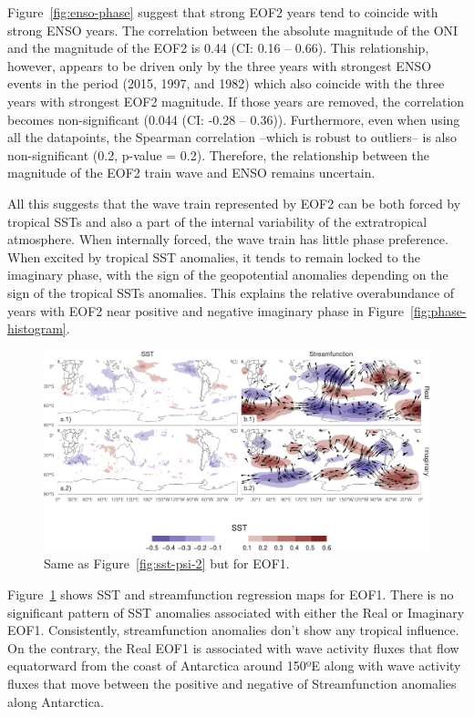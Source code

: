 \documentclass[smallextended]{svjour3}       %
\begin{document}
Figure~\ref{fig:enso-phase} suggest that strong EOF2 years tend to coincide with strong ENSO years. The correlation between the absolute magnitude of the ONI and the magnitude of the EOF2 is 0.44 (CI: 0.16 -- 0.66). This relationship, however, appears to be driven only by the three years with strongest ENSO events in the period (2015, 1997, and 1982) which also coincide with the three years with strongest EOF2 magnitude. If those years are removed, the correlation becomes non-significant (0.044 (CI: -0.28 -- 0.36)). Furthermore, even when using all the datapoints, the Spearman correlation --which is robust to outliers-- is also non-significant (0.2, p-value = 0.2). Therefore, the relationship between the magnitude of the EOF2 train wave and ENSO remains uncertain.

All this suggests that the wave train represented by EOF2 can be both forced by tropical SSTs and also a part of the internal variability of the extratropical atmosphere. When internally forced, the wave train has little phase preference. When excited by tropical SST anomalies, it tends to remain locked to the imaginary phase, with the sign of the geopotential anomalies depending on the sign of the tropical SSTs anomalies. This explains the relative overabundance of years with EOF2 near positive and negative imaginary phase in Figure~\ref{fig:phase-histogram}.



\begin{figure}
\includegraphics{../figures/sst-psi-1-1} \caption{Same as Figure~\ref{fig:sst-psi-2} but for EOF1.}\label{fig:sst-psi-1}
\end{figure}

Figure~\ref{fig:sst-psi-1} shows SST and streamfunction regression maps for EOF1. There is no significant pattern of SST anomalies associated with either the Real or Imaginary EOF1. Consistently, streamfunction anomalies don't show any tropical influence. On the contrary, the Real EOF1 is associated with wave activity fluxes that flow equatorward from the coast of Antarctica around 150ºE along with wave activity fluxes that move between the positive and negative of Streamfunction anomalies along Antarctica.
\end{document}
